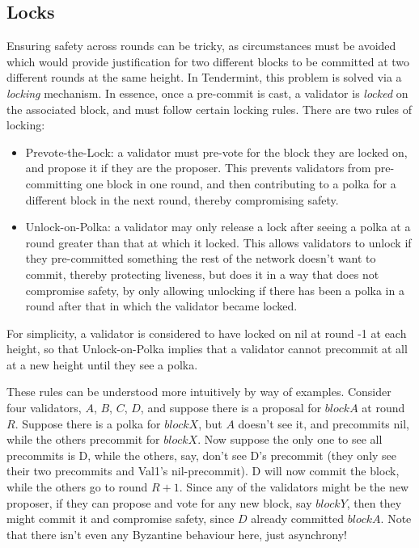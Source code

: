 \subsection{Locks}

Ensuring safety across rounds can be tricky, 
as circumstances must be avoided which would provide justification for two different blocks to be committed at two different rounds at the same height.
In Tendermint, this problem is solved via a \emph{locking} mechanism.
In essence, once a pre-commit is cast, a validator is \emph{locked} on the associated block, and must follow certain locking rules.
There are two rules of locking:

\begin{itemize}
\item{Prevote-the-Lock: a validator must pre-vote for the block they are locked on,
	and propose it if they are the proposer.	
	This prevents validators from pre-committing one block in one round, 
	and then contributing to a polka for a different block in the next round, 
	thereby compromising safety.}
\item{Unlock-on-Polka: a validator may only release a lock after seeing a polka at a round greater than that at which it locked.
	This allows validators to unlock if they pre-committed something the rest of the network doesn't want to commit,
	thereby protecting liveness, but does it in a way that does not compromise safety,
	by only allowing unlocking if there has been a polka in a round after that in which the validator became locked.}
\end{itemize}


For simplicity, a validator is considered to have locked on nil at round -1 at each height, 
so that Unlock-on-Polka implies that a validator cannot precommit at all at a new height until they see a polka.

These rules can be understood more intuitively by way of examples. 
Consider four validators, $A$, $B$, $C$, $D$, and suppose there is a proposal for $blockA$ at round $R$. 
Suppose there is a polka for $blockX$, 
but $A$ doesn't see it, and precommits nil, 
while the others precommit for $blockX$.
Now suppose the only one to see all precommits is D, 
while the others, say, don't see D's precommit (they only see their two precommits and Val1's nil-precommit).
D will now commit the block, while the others go to round $R+1$.
Since any of the validators might be the new proposer, 
if they can propose and vote for any new block, say $blockY$, 
then they might commit it and compromise safety, since $D$ already committed $blockA$.
Note that there isn't even any Byzantine behaviour here, just asynchrony!

